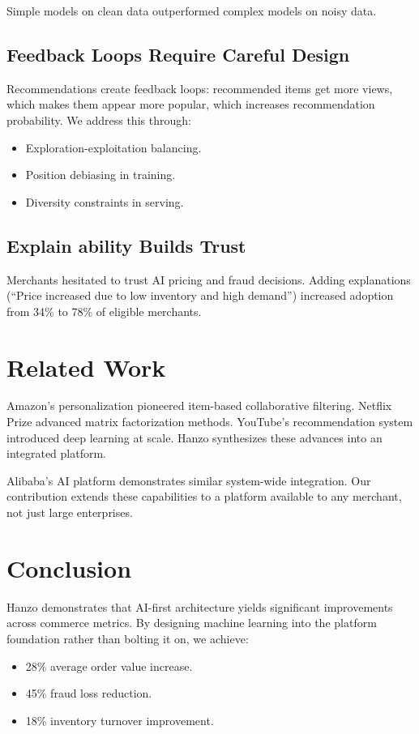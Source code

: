 \documentclass[11pt,twocolumn]{article}
\begin{document}
Simple models on clean data outperformed complex models on noisy data.

\subsection{Feedback Loops Require Careful Design}

Recommendations create feedback loops: recommended items get more views, which makes them appear more popular, which increases recommendation probability. We address this through:
\begin{itemize}
\item Exploration-exploitation balancing.
\item Position debiasing in training.
\item Diversity constraints in serving.
\end{itemize}

\subsection{Explain ability Builds Trust}

Merchants hesitated to trust AI pricing and fraud decisions. Adding explanations (``Price increased due to low inventory and high demand'') increased adoption from 34\% to 78\% of eligible merchants.

\section{Related Work}

Amazon's personalization \cite{linden2003} pioneered item-based collaborative filtering. Netflix Prize \cite{netflix2009} advanced matrix factorization methods. YouTube's recommendation system \cite{youtube2016} introduced deep learning at scale. Hanzo synthesizes these advances into an integrated platform.

Alibaba's AI platform \cite{alibaba2017} demonstrates similar system-wide integration. Our contribution extends these capabilities to a platform available to any merchant, not just large enterprises.

\section{Conclusion}

Hanzo demonstrates that AI-first architecture yields significant improvements across commerce metrics. By designing machine learning into the platform foundation rather than bolting it on, we achieve:
\begin{itemize}
\item 28\% average order value increase.
\item 45\% fraud loss reduction.
\item 18\% inventory turnover improvement.
\end{itemize}
\end{document}
